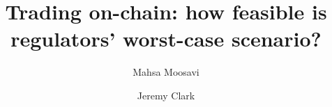 \documentclass[letterpaper,twocolumn,10pt]{article}
\begin{document}

\title{\Large \bf Trading on-chain: how feasible is regulators' worst-case scenario?}

\author{Mahsa Moosavi}
\author{Jeremy Clark}



\maketitle










\appendix



\clearpage


\end{document}
